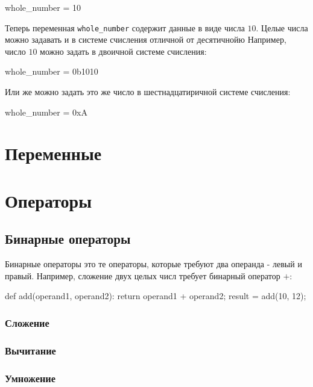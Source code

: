 \begin{python}
whole_number = 10
\end{python}

Теперь переменная \texttt{whole\_number} содержит данные в виде числа $10$. Целые числа
можно задавать и в системе счисления отличной от десятичнойю Например, число $10$ можно задать
в двоичной системе счисления:

\begin{python}
whole_number = 0b1010
\end{python}

Или же можно задать это же число в шестнадцатиричной системе счисления:

\begin{python}
whole_number = 0xA
\end{python}



\section{Переменные}

\section{Операторы}

\subsection{Бинарные операторы}

Бинарные операторы это те операторы, которые требуют два операнда - левый и 
правый. Например, сложение двух целых числ требует бинарный оператор $+$:

\begin{python}
def add(operand1, operand2):
	return operand1 + operand2;
result = add(10, 12);
\end{python}

\subsubsection{Сложение}

\subsubsection{Вычитание}

\subsubsection{Умножение}


